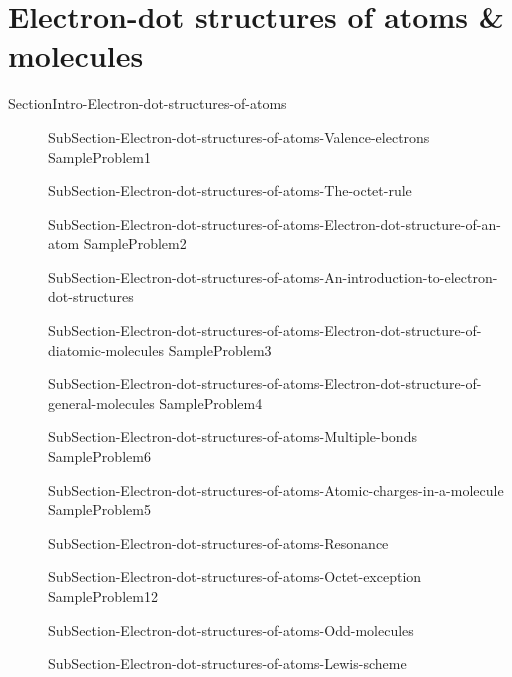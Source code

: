 \documentclass[main.tex]{subfiles}
\newcommand\chapterlabel{Ch-electronicstructure}\setcounter{figurenewcounter}{0}\setcounter{tablenewcounter}{0}\setcounter{formulanewcounter}{0}\chapterpicture{../{\chapterlabel}/figure1}\chapterpicturelabel{PxFuel}
\begin{document}
\section{Electron-dot structures of atoms \& molecules}{SectionIntro-Electron-dot-structures-of-atoms}
\sloppy\begin{description}
\item[] {SubSection-Electron-dot-structures-of-atoms-Valence-electrons}
{SampleProblem1}
\item[] {SubSection-Electron-dot-structures-of-atoms-The-octet-rule}
\item[] {SubSection-Electron-dot-structures-of-atoms-Electron-dot-structure-of-an-atom}
{SampleProblem2}
\item[] {SubSection-Electron-dot-structures-of-atoms-An-introduction-to-electron-dot-structures}
\item[] {SubSection-Electron-dot-structures-of-atoms-Electron-dot-structure-of-diatomic-molecules}
{SampleProblem3}
\item[] {SubSection-Electron-dot-structures-of-atoms-Electron-dot-structure-of-general-molecules}
{SampleProblem4}
\item[] {SubSection-Electron-dot-structures-of-atoms-Multiple-bonds}
{SampleProblem6}
\item[] {SubSection-Electron-dot-structures-of-atoms-Atomic-charges-in-a-molecule}
{SampleProblem5}
\item[] {SubSection-Electron-dot-structures-of-atoms-Resonance}
\item[] {SubSection-Electron-dot-structures-of-atoms-Octet-exception}
{SampleProblem12}
\item[] {SubSection-Electron-dot-structures-of-atoms-Odd-molecules}
\item[]{SubSection-Electron-dot-structures-of-atoms-Lewis-scheme}  
\end{description}
 
\end{document}
